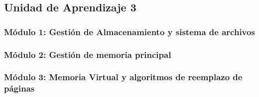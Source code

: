 \subsection{Unidad de Aprendizaje 3}

\subsubsection{Módulo 1: Gestión de Almacenamiento y sistema de archivos}

\subsubsection{Módulo 2: Gestión de memoria principal}

\subsubsection{Módulo 3: Memoria Virtual y algoritmos de reemplazo de páginas}